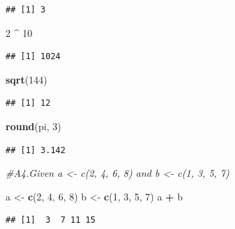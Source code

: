 \documentclass[
]{article}
\newenvironment{Shaded}{\begin{snugshade}}{\end{snugshade}}
\newcommand{\CommentTok}[1]{\textcolor[rgb]{0.56,0.35,0.01}{\textit{#1}}}
\newcommand{\DecValTok}[1]{\textcolor[rgb]{0.00,0.00,0.81}{#1}}
\newcommand{\FunctionTok}[1]{\textcolor[rgb]{0.13,0.29,0.53}{\textbf{#1}}}
\newcommand{\NormalTok}[1]{#1}
\newcommand{\OtherTok}[1]{\textcolor[rgb]{0.56,0.35,0.01}{#1}}
\newcommand{\SpecialCharTok}[1]{\textcolor[rgb]{0.81,0.36,0.00}{\textbf{#1}}}
\begin{document}
\begin{verbatim}
## [1] 3
\end{verbatim}

\begin{Shaded}
\begin{Highlighting}[]
\DecValTok{2} \SpecialCharTok{\^{}} \DecValTok{10}
\end{Highlighting}
\end{Shaded}

\begin{verbatim}
## [1] 1024
\end{verbatim}

\begin{Shaded}
\begin{Highlighting}[]
\FunctionTok{sqrt}\NormalTok{(}\DecValTok{144}\NormalTok{)}
\end{Highlighting}
\end{Shaded}

\begin{verbatim}
## [1] 12
\end{verbatim}

\begin{Shaded}
\begin{Highlighting}[]
\FunctionTok{round}\NormalTok{(pi, }\DecValTok{3}\NormalTok{)}
\end{Highlighting}
\end{Shaded}

\begin{verbatim}
## [1] 3.142
\end{verbatim}

\begin{Shaded}
\begin{Highlighting}[]
\CommentTok{\#A4.Given a \textless{}{-} c(2, 4, 6, 8) and b \textless{}{-} c(1, 3, 5, 7)}

\NormalTok{a }\OtherTok{\textless{}{-}} \FunctionTok{c}\NormalTok{(}\DecValTok{2}\NormalTok{, }\DecValTok{4}\NormalTok{, }\DecValTok{6}\NormalTok{, }\DecValTok{8}\NormalTok{)}
\NormalTok{b }\OtherTok{\textless{}{-}} \FunctionTok{c}\NormalTok{(}\DecValTok{1}\NormalTok{, }\DecValTok{3}\NormalTok{, }\DecValTok{5}\NormalTok{, }\DecValTok{7}\NormalTok{)}
\NormalTok{a }\SpecialCharTok{+}\NormalTok{ b}
\end{Highlighting}
\end{Shaded}

\begin{verbatim}
## [1]  3  7 11 15
\end{verbatim}
\end{document}
